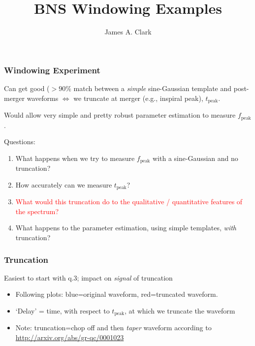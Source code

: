 \documentclass{beamer}
\begin{document}
\title{BNS Windowing Examples}
\author{James A. Clark}
\date{} 

\begin{frame}[plain]
\titlepage
\end{frame}



\begin{frame}
    \frametitle{Windowing Experiment}
    Can get good ($>90\%$ match between a \emph{simple} sine-Gaussian template and
    post-merger waveforms $\iff$ we truncate at merger (e.g., inspiral peak),
    $t_{\text{peak}}$.

    Would allow very simple and pretty robust parameter estimation to measure
    $f_{\text{peak}}$.

    Questions:
    \begin{enumerate}
        \item What happens when we try to measure $f_{\text{peak}}$ with a
            sine-Gaussian and no truncation?
        \item How accurately can we measure $t_{\text{peak}}$?
        \item \textcolor{red}{What would this truncation do to the qualitative / quantitative
            features of the spectrum?}
        \item What happens to the parameter estimation, using simple templates,
            \emph{with} truncation?
    \end{enumerate}

\end{frame}

\begin{frame}
    \frametitle{Truncation}
    Easiest to start with q.3; impact on \emph{signal} of truncation
    \begin{itemize}
        \item Following plots: blue=original waveform, red=truncated waveform.

        \item `Delay' = time, with respect to $t_{\mathrm{peak}}$, at which we
            truncate the waveform

        \item Note: truncation=chop off and then \emph{taper} waveform according
            to \url{http://arxiv.org/abs/gr-qc/0001023}

    \end{itemize}
    
\end{frame}
\end{document}
